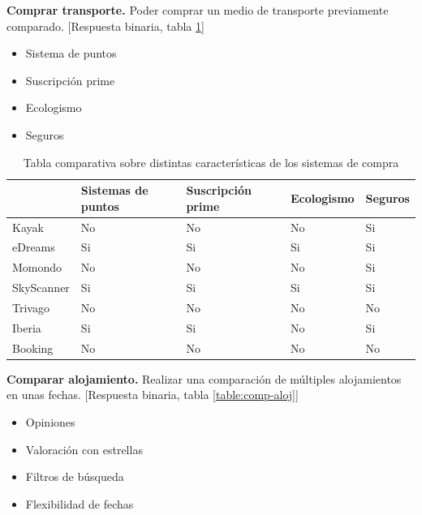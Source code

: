 \textbf{Comprar transporte.} Poder comprar un medio de transporte previamente comparado. [Respuesta binaria, tabla \ref{table:comprar-transporte}]

\begin{itemize}
    \item Sistema de puntos
    \item Suscripción prime 
    \item Ecologismo 
    \item Seguros
\end{itemize}

\begin{table}[H]
    \centering
    \begin{tabular}{l|l|l|l|l|}
    \cline{2-5}
                                     & Sistemas de puntos & Suscripción prime & Ecologismo & Seguros \\ \hline
    \multicolumn{1}{|l|}{Kayak}      & No                 & No                & No         & Si      \\ \hline
    \multicolumn{1}{|l|}{eDreams}    & Si                 & Si                & Si         & Si      \\ \hline
    \multicolumn{1}{|l|}{Momondo}    & No                 & No                & No         & Si      \\ \hline
    \multicolumn{1}{|l|}{SkyScanner} & Si                 & Si                & Si         & Si      \\ \hline
    \multicolumn{1}{|l|}{Trivago}    & No                 & No                & No         & No      \\ \hline
    \multicolumn{1}{|l|}{Iberia}     & Si                 & Si                & No         & Si      \\ \hline
    \multicolumn{1}{|l|}{Booking}    & No                 & No                & No         & No      \\ \hline
    \end{tabular}
    \caption{Tabla comparativa sobre distintas características de los sistemas de compra}
    \label{table:comprar-transporte}
    \end{table}

\textbf{Comparar alojamiento.} Realizar una comparación de múltiples alojamientos en unas fechas. [Respuesta binaria, tabla \ref{table:comp-aloj}]

\begin{itemize}
    \item Opiniones 
    \item Valoración con estrellas 
    \item Filtros de búsqueda 
    \item Flexibilidad de fechas
\end{itemize}

